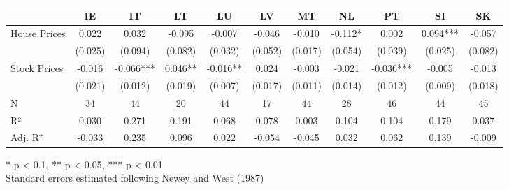 \documentclass[
  a4paper,
  DIV=11,
  numbers=noendperiod]{scrartcl}
\begin{document}
\begin{landscape}
\begin{table}[h]
\fontsize{7.5pt}{9.0pt}\selectfont
\begin{tabular*}{\linewidth}{@{\extracolsep{\fill}}lcccccccccc}
\toprule
  & IE & IT & LT & LU & LV & MT & NL & PT & SI & SK \\ 
\midrule\addlinespace[2.5pt]
House Prices & 0.022 & 0.032 & -0.095 & -0.007 & -0.046 & -0.010 & -0.112* & 0.002 & 0.094*** & -0.057 \\ 
 & (0.025) & (0.094) & (0.082) & (0.032) & (0.052) & (0.017) & (0.054) & (0.039) & (0.025) & (0.082) \\ 
Stock Prices & -0.016 & -0.066*** & 0.046** & -0.016** & 0.024 & -0.003 & -0.021 & -0.036*** & -0.005 & -0.013 \\ 
{} & {(0.021)} & {(0.012)} & {(0.019)} & {(0.007)} & {(0.017)} & {(0.011)} & {(0.014)} & {(0.012)} & {(0.009)} & {(0.018)} \\ 
N & 34 & 44 & 20 & 44 & 17 & 44 & 28 & 46 & 44 & 45 \\ 
R² & 0.030 & 0.271 & 0.191 & 0.068 & 0.078 & 0.003 & 0.104 & 0.104 & 0.179 & 0.037 \\ 
Adj. R² & -0.033 & 0.235 & 0.096 & 0.022 & -0.054 & -0.045 & 0.032 & 0.062 & 0.139 & -0.009 \\ 
\bottomrule
\end{tabular*}
\begin{minipage}{\linewidth}
* p < 0.1, ** p < 0.05, *** p < 0.01\\
Standard errors estimated following Newey and West (1987)\\
\end{minipage}
\end{table}




\end{landscape}

\newpage{}
\end{document}
